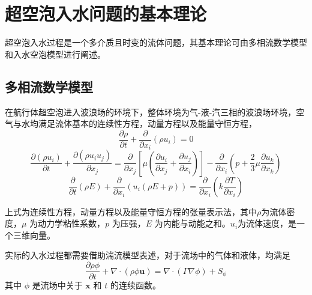 \chapter{超空泡入水问题的基本理论}
超空泡入水过程是一个多介质且时变的流体问题，其基本理论可由多相流数学模型和入水空泡模型进行阐述。
\section{多相流数学模型}
在航行体超空泡进入波浪场的环境下，整体环境为气-液-汽三相的波浪场环境，空气与水均满足流体基本的连续性方程，动量方程以及能量守恒方程，
\begin{equation}
  \frac {\partial \rho}{\partial t} + \frac {\partial}{\partial x_i} (\rho u_i) = 0
\end{equation}
\begin{equation}
  \frac {\partial (\rho u_i)}{\partial t} + \frac {\partial (\rho u_i u_j)}{\partial x_j} = \frac {\partial}{\partial x_j} \left[ \mu \left( \frac {\partial u_i}{\partial x_j} + \frac {\partial u_j}{\partial x_i} \right) \right] - \frac {\partial}{\partial x_i} \left( p + \frac 2 3 \mu \frac {\partial u_k}{\partial x_k} \right)
\end{equation}
\begin{equation}
  \frac \partial {\partial t} (\rho E) + \frac \partial {\partial x_i} \left( u_i (\rho E + p) \right) = \frac \partial {\partial x_i} \left( k \frac {\partial T}{\partial x_i} \right)
\end{equation}

上式为连续性方程，动量方程以及能量守恒方程的张量表示法，其中$\rho$为流体密度，$\mu$ 为动力学粘性系数，$p$ 为压强，$E$ 为内能与动能之和。$u_i$为流体速度，是一个三维向量。

实际的入水过程都需要借助湍流模型表述\cite{Kliafas1987}，对于流场中的气体和液体，均满足
\begin{equation}
  \frac {\partial \rho \phi}{\partial t} + \nabla \cdot (\rho \phi \mathbf u) = \nabla \cdot (\Gamma \nabla \phi) + S_{\phi}
\end{equation}
其中 $\phi$ 是流场中关于 $\mathbf x$ 和 $t$ 的连续函数。

